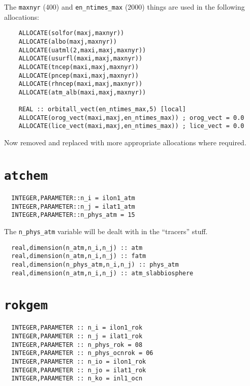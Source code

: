 \documentclass[a4paper,10pt,article]{memoir}
\begin{document}
The \texttt{maxnyr} (400) and \texttt{en\_ntimes\_max} (2000) things
are used in the following allocations:

\begin{verbatim}
    ALLOCATE(solfor(maxj,maxnyr))
    ALLOCATE(albo(maxj,maxnyr))
    ALLOCATE(uatml(2,maxi,maxj,maxnyr))
    ALLOCATE(usurfl(maxi,maxj,maxnyr))
    ALLOCATE(tncep(maxi,maxj,maxnyr))
    ALLOCATE(pncep(maxi,maxj,maxnyr))
    ALLOCATE(rhncep(maxi,maxj,maxnyr))
    ALLOCATE(atm_alb(maxi,maxj,maxnyr))

    REAL :: orbitall_vect(en_ntimes_max,5) [local]
    ALLOCATE(orog_vect(maxi,maxj,en_ntimes_max)) ; orog_vect = 0.0
    ALLOCATE(lice_vect(maxi,maxj,en_ntimes_max)) ; lice_vect = 0.0
\end{verbatim}

Now removed and replaced with more appropriate allocations where
required.

\section{\texttt{atchem}}

\begin{verbatim}
  INTEGER,PARAMETER::n_i = ilon1_atm
  INTEGER,PARAMETER::n_j = ilat1_atm
  INTEGER,PARAMETER::n_phys_atm = 15
\end{verbatim}

The \texttt{n\_phys\_atm} variable will be dealt with in the
``tracers'' stuff.

\begin{verbatim}
  real,dimension(n_atm,n_i,n_j) :: atm
  real,dimension(n_atm,n_i,n_j) :: fatm
  real,dimension(n_phys_atm,n_i,n_j) :: phys_atm
  real,dimension(n_atm,n_i,n_j) :: atm_slabbiosphere
\end{verbatim}

\section{\texttt{rokgem}}

\begin{verbatim}
  INTEGER,PARAMETER :: n_i = ilon1_rok
  INTEGER,PARAMETER :: n_j = ilat1_rok
  INTEGER,PARAMETER :: n_phys_rok = 08
  INTEGER,PARAMETER :: n_phys_ocnrok = 06
  INTEGER,PARAMETER :: n_io = ilon1_rok
  INTEGER,PARAMETER :: n_jo = ilat1_rok
  INTEGER,PARAMETER :: n_ko = inl1_ocn
\end{verbatim}
\end{document}
